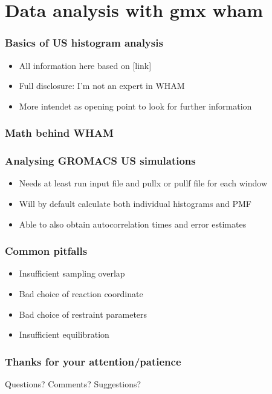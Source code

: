 \documentclass{beamer}
\numberwithin{table}{section}
\numberwithin{figure}{section}
\numberwithin{equation}{section}
\begin{document}
\section{Data analysis with gmx wham}

\begin{frame}
\frametitle{Basics of US histogram analysis}
    \begin{itemize}
        \item{All information here based on [link]}
        \item{Full disclosure: I'm not an expert in WHAM}
        \item{More intendet as opening point to look for further information}
    \end{itemize}
\end{frame}

\begin{frame}
\frametitle{Math behind WHAM}
\end{frame}

\begin{frame}
\frametitle{Analysing GROMACS US simulations}
    \begin{itemize}
        \item{Needs at least run input file and pullx or pullf file for each window}
        \item{Will by default calculate both individual histograms and PMF}
        \item{Able to also obtain autocorrelation times and error estimates}
    \end{itemize}
\end{frame}

\begin{frame}
\frametitle{Common pitfalls}
    \begin{itemize}
        \item{Insufficient sampling overlap}
        \item{Bad choice of reaction coordinate}
        \item{Bad choice of restraint parameters}
        \item{Insufficient equilibration}
    \end{itemize}
\end{frame}

\begin{frame}
\frametitle{Thanks for your attention/patience}
Questions? Comments? Suggestions?
\end{frame}
\end{document}
